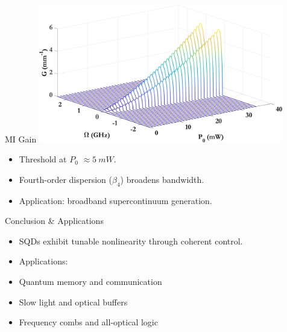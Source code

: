 \documentclass[12pt,aspectratio=1610]{beamer}
\begin{document}
\begin{frame}{MI Gain}
  \vspace{-12pt}
  \hspace*{32pt}
  \includegraphics[width=0.8\textwidth]{Assets/Beta2_Kerr.jpeg}
  \begin{itemize}
    \item Threshold at $P_0$ $\approx 5\ mW$.
    \item Fourth-order dispersion ($\beta_4$) broadens bandwidth.
    \item Application: broadband supercontinuum generation.
  \end{itemize}
\end{frame}

\begin{frame}{Conclusion \& Applications}
  \begin{itemize}
    \item SQDs exhibit tunable nonlinearity through coherent control.
    \item Applications:
    \item Quantum memory and communication
    \item Slow light and optical buffers
    \item Frequency combs and all-optical logic
  \end{itemize}
\end{frame}
\end{document}
